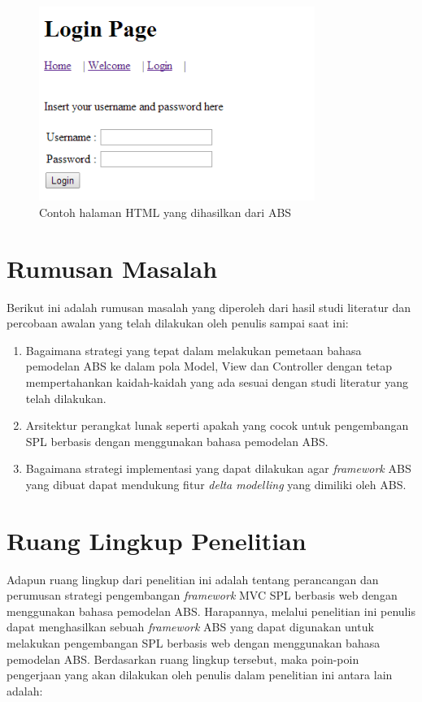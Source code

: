 \begin{figure}
    \centering
    \includegraphics[width=0.8\textwidth]
        {img/login-page.png}
    \caption{Contoh halaman HTML yang dihasilkan dari ABS}
\end{figure}

\section{Rumusan Masalah}
\noindent
Berikut ini adalah rumusan masalah yang diperoleh dari hasil studi literatur dan percobaan awalan yang telah dilakukan oleh penulis sampai saat ini:

\begin{enumerate}
    \item Bagaimana strategi yang tepat dalam melakukan pemetaan bahasa pemodelan ABS ke dalam pola Model, View dan Controller dengan tetap mempertahankan kaidah-kaidah yang ada sesuai dengan studi literatur yang telah dilakukan.
    \item Arsitektur perangkat lunak seperti apakah yang cocok untuk pengembangan SPL berbasis dengan menggunakan bahasa pemodelan ABS.
    \item Bagaimana strategi implementasi yang dapat dilakukan agar \textit{framework} ABS yang dibuat dapat mendukung fitur \textit{delta modelling} yang dimiliki oleh ABS. 
\end{enumerate}

\section{Ruang Lingkup Penelitian}
\noindent
Adapun ruang lingkup dari penelitian ini adalah tentang perancangan dan perumusan strategi pengembangan \textit{framework} MVC SPL berbasis web dengan menggunakan bahasa pemodelan ABS. Harapannya, melalui penelitian ini penulis dapat menghasilkan sebuah \textit{framework} ABS yang dapat digunakan untuk melakukan pengembangan SPL berbasis web dengan menggunakan bahasa pemodelan ABS. Berdasarkan ruang lingkup tersebut, maka poin-poin pengerjaan yang akan dilakukan oleh penulis dalam penelitian ini antara lain adalah:

